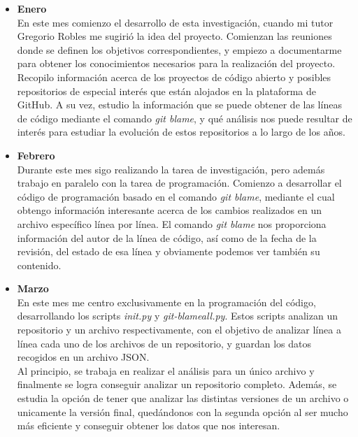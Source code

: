 \documentclass[a4paper, 12pt]{book}
\begin{document}
\begin{itemize}

  \item \textbf{Enero}
  \\En este mes comienzo el desarrollo de esta investigación, cuando mi tutor Gregorio Robles me sugirió la idea del proyecto.
  Comienzan las reuniones donde se definen los objetivos correspondientes, y empiezo a documentarme para obtener los conocimientos
  necesarios para la realización del proyecto.
  \\Recopilo información acerca de los proyectos de código abierto y posibles repositorios de especial interés que están alojados en la plataforma de GitHub.
  A su vez, estudio la información que se puede obtener de las líneas de código mediante el comando \textit{git blame}, y qué análisis nos puede
  resultar de interés para estudiar la evolución de estos repositorios a lo largo de los años.

  \item \textbf{Febrero}
  \\Durante este mes sigo realizando la tarea de investigación, pero además trabajo en paralelo con la tarea de programación. Comienzo a 
  desarrollar el código de programación basado en el comando \textit{git blame}, mediante el cual obtengo información interesante acerca de
  los cambios realizados en un archivo específico línea por línea. El comando \textit{git blame} nos proporciona información del autor de la
  línea de código, así como de la fecha de la revisión, del estado de esa línea y obviamente podemos ver también su contenido.
  
  \item \textbf{Marzo}
  \\En este mes me centro exclusivamente en la programación del código, desarrollando los scripts \textit{init.py} y \textit{git-blameall.py}. Estos scripts
  analizan un repositorio y un archivo respectivamente, con el objetivo de analizar línea a línea cada uno de los archivos de un repositorio, y guardan los datos recogidos en un archivo JSON.
  \\Al principio, se trabaja en realizar el análisis para un único archivo y finalmente se logra conseguir analizar un repositorio completo. Además, se estudia
  la opción de tener que analizar las distintas versiones de un archivo o unicamente la versión final, quedándonos con la segunda opción al ser mucho más eficiente y 
  conseguir obtener los datos que nos interesan.
  

\end{itemize}
\end{document}
